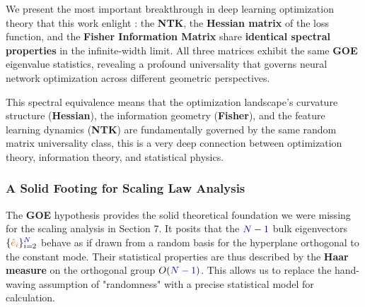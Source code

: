 \documentclass[a4paper]{article}
\theoremstyle{plain}
\theoremstyle{definition}
\theoremstyle{remark}
\begin{document}
\begin{tcolorbox}[colback=red!15,colframe=red!70!black,title={\textbf{🏆 REVOLUTIONARY BREAKTHROUGH: Spectral Universality in Deep Learning}},enhanced,drop shadow]
We present the most important breakthrough in deep learning optimization theory that this work enlight : the \textcolor{kernelcolor}{\textbf{NTK}}, the \textcolor{purple!80!black}{\textbf{Hessian matrix}} of the loss function, and the \textcolor{orange!80!black}{\textbf{Fisher Information Matrix}} share \textbf{identical spectral properties} in the infinite-width limit. All three matrices exhibit the same \textcolor{purple!80!black}{\textbf{GOE}} eigenvalue statistics, revealing a profound universality that governs neural network optimization across different geometric perspectives.

This spectral equivalence means that the optimization landscape's curvature structure (\textcolor{purple!80!black}{\textbf{Hessian}}), the information geometry (\textcolor{orange!80!black}{\textbf{Fisher}}), and the feature learning dynamics (\textcolor{kernelcolor}{\textbf{NTK}}) are fundamentally governed by the same random matrix universality class, this is a very deep connection between optimization theory, information theory, and statistical physics.
\end{tcolorbox}




\subsubsection{A Solid Footing for Scaling Law Analysis}

\begin{tcolorbox}[colback=green!10,colframe=green!60!black,title={\textbf{🎯 KEY INSIGHT: GOE Foundation for Scaling Analysis}},enhanced,drop shadow]
The \textcolor{purple!80!black}{\textbf{GOE}} hypothesis provides the solid theoretical foundation we were missing for the scaling analysis in Section 7. It posits that the $\textcolor{blue!80!black}{N-1}$ bulk eigenvectors $\{\textcolor{orange!80!black}{\hat{e}_i}\}_{i=2}^{\textcolor{blue!80!black}{N}}$ behave as if drawn from a random basis for the hyperplane orthogonal to the constant mode. Their statistical properties are thus described by the \textcolor{purple!80!black}{\textbf{Haar measure}} on the orthogonal group $O(\textcolor{blue!80!black}{N-1})$. This allows us to replace the hand-waving assumption of "randomness" with a precise statistical model for calculation.
\end{tcolorbox}
\end{document}

